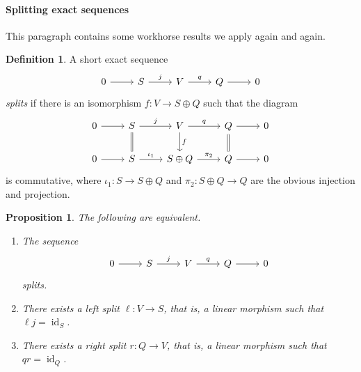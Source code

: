 \documentclass[11pt]{article}
\newtheorem{prop}[theo]{Proposition}
\theoremstyle{definition}
\newtheorem{defi}[theo]{Definition}
\DeclareMathOperator{\id}{id}
\begin{document}
\paragraph{Splitting exact sequences}


This paragraph contains some workhorse results we apply again and again.


\begin{defi}
A short exact sequence
\[
\begin{tikzcd}
0 \ar[r] & S \ar[r,"j"] & V \ar[r,"q"] & Q \ar[r] & 0
\end{tikzcd}
\]
\emph{splits} if there is an isomorphism $f : V \to S \oplus Q$ such that the diagram
\[
\begin{tikzcd}
0 \ar[r] & S \ar[r,"j"] \arrow[d,equal] & V \ar[r,"q"] \ar[d,"f"] & Q \ar[r] \ar[d,equal] & 0
\\
0 \ar[r] & S \ar[r,"\iota_1"] & S \oplus Q \ar[r,"\pi_2"] & Q \ar[r] & 0
\end{tikzcd}
\]
is commutative, where $\iota_1 : S \to S \oplus Q$ and $\pi_2 : S \oplus Q \to Q$ are the obvious injection and projection.
\end{defi}


\begin{prop}
The following are equivalent.
\begin{enumerate}
\item
The sequence
\[
\begin{tikzcd}
0 \ar[r] & S \ar[r,"j"] & V \ar[r,"q"] & Q \ar[r] & 0
\end{tikzcd}
\]
splits.

\item
There exists a left split $\ell : V \to S$, that is, a linear morphism such that $\ell j = \id_S$.

\item
There exists a right split $r : Q \to V$, that is, a linear morphism such that $qr = \id_Q$.
\end{enumerate}
\end{prop}
\end{document}
